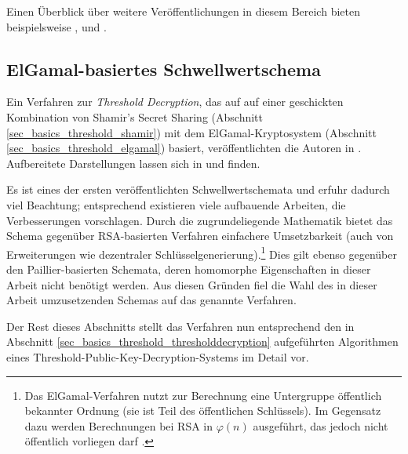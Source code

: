 Einen Überblick über weitere Veröffentlichungen in diesem Bereich bieten beispielsweise \cite{desmedt1997some}, \cite{gemmell1997} und \cite{desmedt1993}.

\subsection{ElGamal-basiertes Schwellwertschema}

\label{sec_state_threshold_scheme}

Ein Verfahren zur \textit{Threshold Decryption}, das auf auf einer geschickten Kombination von Shamir's Secret Sharing (Abschnitt \ref{sec_basics_threshold_shamir}) mit dem ElGamal-Kryptosystem (Abschnitt \ref{sec_basics_threshold_elgamal}) basiert, veröffentlichten die Autoren in \cite{DesmedtFrankel1990}. Aufbereitete Darstellungen lassen sich in \cite{katz2014} und \cite{boneh2016} finden. 

Es ist eines der ersten veröffentlichten Schwellwertschemata und erfuhr dadurch viel Beachtung; entsprechend existieren viele aufbauende Arbeiten, die Verbesserungen vorschlagen. Durch die zugrundeliegende Mathematik bietet das Schema gegenüber RSA-basierten Verfahren einfachere Umsetzbarkeit (auch von Erweiterungen wie dezentraler Schlüsselgenerierung).\footnote{
  Das ElGamal-Verfahren nutzt zur Berechnung eine Untergruppe öffentlich bekannter Ordnung (sie ist Teil des öffentlichen Schlüssels). Im Gegensatz dazu werden Berechnungen bei RSA in \(\varphi(n)\) ausgeführt, das jedoch nicht öffentlich vorliegen darf \cite{nguyen2005}.
} Dies gilt ebenso gegenüber den Paillier-basierten Schemata, deren homomorphe Eigenschaften in dieser Arbeit nicht benötigt werden. Aus diesen Gründen fiel die Wahl des in dieser Arbeit umzusetzenden Schemas auf das genannte Verfahren.

Der Rest dieses Abschnitts stellt das Verfahren nun entsprechend den in Abschnitt \ref{sec_basics_threshold_thresholddecryption} aufgeführten Algorithmen eines Threshold-Public-Key-Decryption-Systems im Detail vor.






